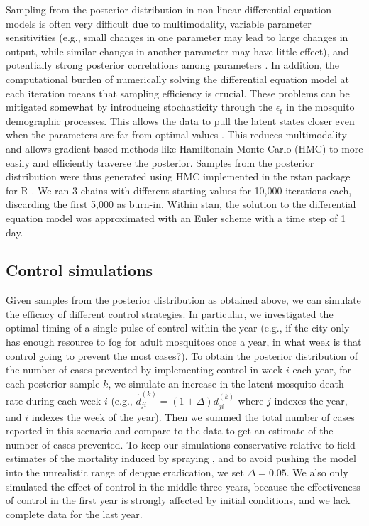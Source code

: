 \documentclass[10pt,letterpaper]{article}
\begin{document}
Sampling from the posterior distribution in non-linear differential equation models is often very difficult due to multimodality, variable parameter sensitivities (e.g., small changes in one parameter may lead to large changes in output, while similar changes in another parameter may have little effect), and potentially strong posterior correlations among parameters \cite{Reilly2005, Girolami2008, Calderhead2011}.
In addition, the computational burden of numerically solving the differential equation model at each iteration means that sampling efficiency is crucial.
These problems can be mitigated somewhat by introducing stochasticity through the $\epsilon_t$ in the mosquito demographic processes.
This allows the data to pull the latent states closer even when the parameters are far from optimal values \cite{Leander2014}.
This reduces multimodality and allows gradient-based methods like Hamiltonain Monte Carlo (HMC) to more easily and efficiently traverse the posterior.
Samples from the posterior distribution were thus generated using HMC implemented in the rstan package \cite{Carpenter2016, Rstan2017} for R \cite{R2016}. 
We ran 3 chains with different starting values for 10,000 iterations each, discarding the first 5,000 as burn-in.
Within stan, the solution to the differential equation model was approximated with an Euler scheme with a time step of 1 day.  

\subsection*{Control simulations}

Given samples from the posterior distribution as obtained above, we can simulate the efficacy of different control strategies.
In particular, we investigated the optimal timing of a single pulse of control within the year (e.g., if the city only has enough resource to fog for adult mosquitoes once a year, in what week is that control going to prevent the most cases?).
To obtain the posterior distribution of the number of cases prevented by implementing control in week $i$ each year, for each posterior sample $k$, we simulate an increase in the latent mosquito death rate during each week $i$ (e.g.,
$\hat{d}^{(k)}_{ji} = (1 + \Delta) d^{(k)}_{ji}$ where $j$ indexes the year, and $i$ indexes the week of the year).
Then we summed the total number of cases reported in this scenario and compare to the data to get an estimate of the number of cases prevented.
To keep our simulations conservative relative to field estimates of the mortality induced by spraying \cite{Esu2010}, and to avoid pushing the model into the unrealistic range of dengue eradication, we set $\Delta = 0.05$.
We also only simulated the effect of control in the middle three years, because the effectiveness of control in the first year is strongly affected by initial conditions, and we lack complete data for the last year.
\end{document}
